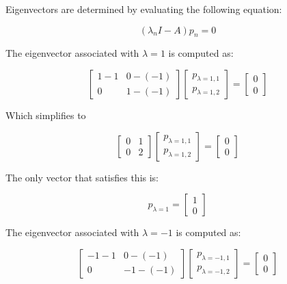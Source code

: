 \documentclass[12pt, letterpaper]{../assignment}
\begin{document}
Eigenvectors are determined by evaluating the following equation:

$$ (\lambda_n I - A)p_n = 0 $$

The eigenvector associated with $\lambda = 1$ is computed as:

$$\left[\begin{array}{ccc} 1-1 & 0-(-1) \\ 0 & 1-(-1) \end{array}\right]
\left[\begin{array}{c} p_{\lambda=1,1} \\ p_{\lambda=1,2} \end{array}\right] =
\left[\begin{array}{c} 0 \\ 0 \end{array}\right]$$

Which simplifies to

$$\left[\begin{array}{ccc} 0 & 1 \\ 0 & 2 \end{array}\right]
\left[\begin{array}{c} p_{\lambda=1,1} \\ p_{\lambda=1,2} \end{array}\right] =
\left[\begin{array}{c} 0 \\ 0 \end{array}\right]$$

The only vector that satisfies this is:

\begin{answer}
    $$ p_{\lambda=1} = \left[\begin{array}{c} 1 \\ 0 \end{array}\right] $$
\end{answer}

The eigenvector associated with $\lambda = -1$ is computed as:

$$\left[\begin{array}{ccc} -1-1 & 0-(-1) \\ 0 & -1-(-1) \end{array}\right]
\left[\begin{array}{c} p_{\lambda=-1,1} \\ p_{\lambda=-1,2} \end{array}\right] =
\left[\begin{array}{c} 0 \\ 0 \end{array}\right]$$
\end{document}
